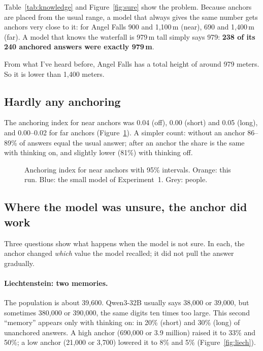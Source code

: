 \documentclass[11pt,a4paper]{article}
\begin{document}
Table~\ref{tab:knowledge} and Figure~\ref{fig:sure} show the problem. Because anchors are placed from the usual range, a model that always gives the same number gets anchors very close to it: for Angel Falls 900 and 1,100\,m (near), 690 and 1,400\,m (far). A model that knows the waterfall is 979\,m tall simply says 979: \textbf{238 of its 240 anchored answers were exactly 979\,m}.

\begin{transcript}
\cut{} From what I've heard before, Angel Falls has a total height of around 979 meters. \cut{} So it is lower than 1,400 meters.
\end{transcript}

\subsection{Hardly any anchoring}

The anchoring index for near anchors was 0.04 (off), 0.00 (short) and 0.05 (long), and 0.00--0.02 for far anchors (Figure~\ref{fig:index}). A simpler count: without an anchor 86--89\% of answers equal the usual answer; after an anchor the share is the same with thinking on, and slightly lower (81\%) with thinking off.

\begin{figure}[ht]
\centering{}
\caption{Anchoring index for near anchors with 95\% intervals. Orange: this run. Blue: the small model of Experiment~1. Grey: people.}
\label{fig:index}
\end{figure}

\subsection{Where the model was unsure, the anchor did work}

Three questions show what happens when the model is not sure. In each, the anchor changed \emph{which} value the model recalled; it did not pull the answer gradually.

\paragraph{Liechtenstein: two memories.} The population is about 39,600. Qwen3-32B usually says 38,000 or 39,000, but sometimes 380,000 or 390,000, the same digits ten times too large. This second \enquote{memory} appears only with thinking on: in 20\% (short) and 30\% (long) of unanchored answers. A high anchor (690,000 or 3.9 million) raised it to 33\% and 50\%; a low anchor (21,000 or 3,700) lowered it to 8\% and 5\% (Figure~\ref{fig:liech}).
\end{document}
